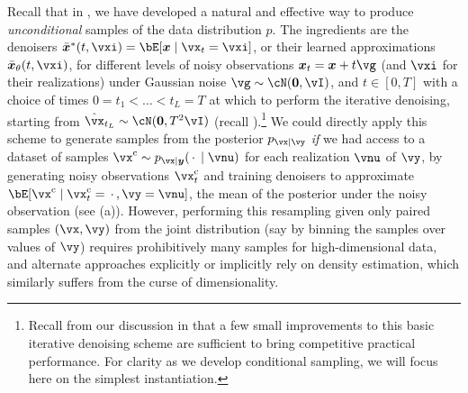 \documentclass[../../book-main.tex]{subfiles}
\begin{document}
Recall that in , we have developed a natural and
effective way to produce \textit{unconditional} samples of the data distribution
$p$. The ingredients are the denoisers $\bar{\x}^\ast(t, \vxi) = \bE[ \x \mid
\vx_t=\vxi ]$, or their learned approximations $\bar{\x}_{\theta}(t, \vxi)$,
for different levels of noisy observations $\x_t = \x + t \vg$ (and $\vxi$ for
their realizations) under
Gaussian noise $\vg \sim \cN(\mathbf{0}, \vI)$, and $t \in
[0, T]$ with a choice of times $0 = t_1 < \hdots < t_{L} = T$ at which to
perform the iterative denoising, starting from $\hat{\vx}_{t_L} \sim
\cN(\mathbf{0}, T^2 \vI)$ (recall ).\footnote{Recall from our discussion in 
that a few small improvements to this basic iterative denoising scheme are
sufficient to bring competitive practical performance. For clarity as we develop
conditional sampling, we will focus here on the simplest instantiation.}
We could directly apply this scheme to generate samples from the posterior
$p_{\vx \mid \vy}$ \textit{if} we had access to a dataset of samples
$\posteriorsample \sim p_{\vx \mid \y}(\spcdot \mid \vnu)$ for each realization
$\vnu$ of $\vy$, by generating noisy observations
$\posteriorsample_t$ and training denoisers to approximate $\bE[
  \posteriorsample \mid \posteriorsample_t=\spcdot, \vy=\vnu ]$, the mean of the posterior under
the noisy observation (see (a)).
However, performing this resampling given only paired samples $(\vx, \vy)$ from the
joint distribution (say by binning the samples over values of $\vy$) requires
prohibitively many samples for high-dimensional data, and alternate approaches
explicitly or implicitly rely on density estimation, which similarly suffers from the
curse of dimensionality.
\end{document}
